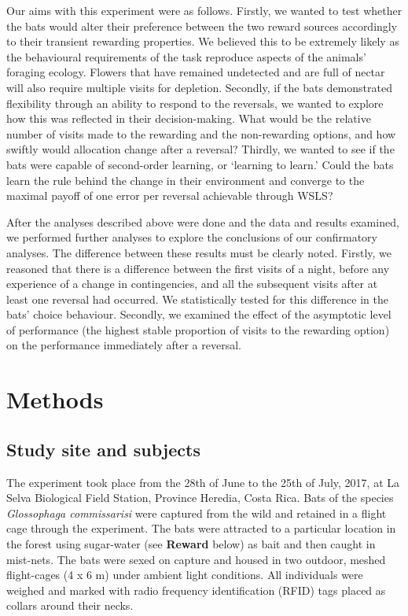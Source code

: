 \documentclass[
]{article}
\begin{document}
Our aims with this experiment were as follows. Firstly, we wanted to test whether the bats would alter their preference between the two reward sources accordingly to their transient rewarding properties. We believed this to be extremely likely as the behavioural requirements of the task reproduce aspects of the animals' foraging ecology. Flowers that have remained undetected and are full of nectar will also require multiple visits for depletion. Secondly, if the bats demonstrated flexibility through an ability to respond to the reversals, we wanted to explore how this was reflected in their decision-making. What would be the relative number of visits made to the rewarding and the non-rewarding options, and how swiftly would allocation change after a reversal? Thirdly, we wanted to see if the bats were capable of second-order learning, or `learning to learn.' Could the bats learn the rule behind the change in their environment and converge to the maximal payoff of one error per reversal achievable through WSLS?

After the analyses described above were done and the data and results examined, we performed further analyses to explore the conclusions of our confirmatory analyses. The difference between these results must be clearly noted. Firstly, we reasoned that there is a difference between the first visits of a night, before any experience of a change in contingencies, and all the subsequent visits after at least one reversal had occurred. We statistically tested for this difference in the bats' choice behaviour. Secondly, we examined the effect of the asymptotic level of performance (the highest stable proportion of visits to the rewarding option) on the performance immediately after a reversal.

\hypertarget{methods}{%
\section{Methods}\label{methods}}

\hypertarget{study-site-and-subjects}{%
\subsection{Study site and subjects}\label{study-site-and-subjects}}

The experiment took place from the 28th of June to the 25th of July, 2017, at La Selva Biological Field Station, Province Heredia, Costa Rica. Bats of the species \emph{Glossophaga commissarisi} were captured from the wild and retained in a flight cage through the experiment. The bats were attracted to a particular location in the forest using sugar-water (see \textbf{Reward} below) as bait and then caught in mist-nets. The bats were sexed on capture and housed in two outdoor, meshed flight-cages (4 x 6 m) under ambient light conditions. All individuals were weighed and marked with radio frequency identification (RFID) tags placed as collars around their necks.
\end{document}
